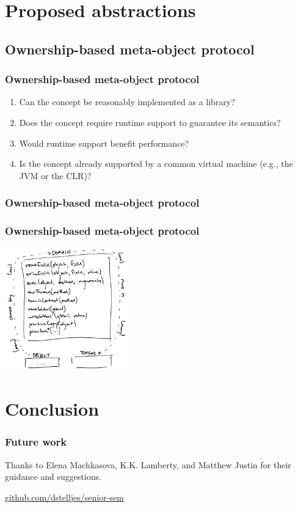 \documentclass{beamer}
\begin{document}
  \section{Proposed abstractions}

  \subsection{Ownership-based meta-object protocol}

  \begin{frame}
    \frametitle{Ownership-based meta-object protocol}

    \begin{enumerate}
      \item Can the concept be reasonably implemented as a library?
      \item Does the concept require runtime support to guarantee its semantics?
      \item Would runtime support benefit performance?
      \item Is the concept already supported by a common virtual machine (e.g., the JVM or the CLR)?
    \end{enumerate}
  \end{frame}

  \begin{frame}
    \frametitle{Ownership-based meta-object protocol}
  \end{frame}

  \begin{frame}
    \frametitle{Ownership-based meta-object protocol}

    \centering

    \includegraphics[width=150pt]{obmop}
  \end{frame}

  \section{Conclusion}

  \begin{frame}
    \frametitle{Future work}
  \end{frame}

  \begin{frame}[standout]
    \centering

    Thanks to Elena Machkasova, K.K. Lamberty, and Matthew Justin for their guidance and suggestions.

    \vfill

    \url{github.com/dstelljes/senior-sem}

    \vfill

    \ccbyncsa{}
  \end{frame}
\end{document}
